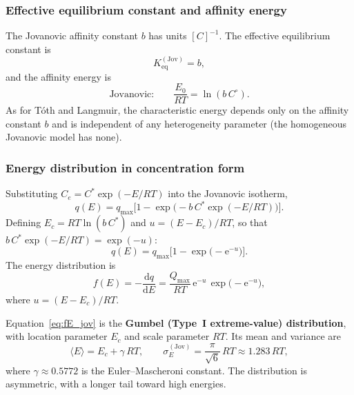 \documentclass[12pt]{article}
\begin{document}
	\subsubsection{Effective equilibrium constant and affinity energy}

	The Jovanovic affinity constant $b$ has units $[C]^{-1}$. The effective
	equilibrium constant is
	\begin{equation}
		K_{\mathrm{eq}}^{\mathrm{(Jov)}} = b,
	\end{equation}
	and the affinity energy is
	\begin{equation}
		\text{Jovanovic:}\qquad
		\frac{E_0}{RT} = \ln(b\,C^\circ).
		\label{eq:E_jov}
	\end{equation}
	As for T\'oth and Langmuir, the characteristic energy depends only on
	the affinity constant $b$ and is independent of any heterogeneity
	parameter (the homogeneous Jovanovic model has none).

	\subsubsection{Energy distribution in concentration form}

	Substituting $C_e = C^{\ast}\exp(-E/RT)$ into the Jovanovic isotherm,
	\begin{equation}
		q(E) = q_{\max}\bigl[1 -
		\exp\!\bigl(-b\,C^{\ast}\exp(-E/RT)\bigr)\bigr].
	\end{equation}
	Defining $E_c = RT\ln(b\,C^{\ast})$ and $u = (E - E_c)/RT$, so that
	$b\,C^{\ast}\exp(-E/RT) = \exp(-u)$:
	\begin{equation}
		q(E) = q_{\max}\bigl[1 -
		\exp\!\bigl(-\mathrm{e}^{-u}\bigr)\bigr].
		\label{eq:qE_jov}
	\end{equation}
	The energy distribution is
	\begin{equation}
		f(E) = -\frac{\mathrm{d}q}{\mathrm{d}E}
		= \frac{Q_{\max}}{RT}\,
		\mathrm{e}^{-u}\,
		\exp\!\bigl(-\mathrm{e}^{-u}\bigr),
		\label{eq:fE_jov}
	\end{equation}
	where $u = (E - E_c)/RT$.

	Equation~\eqref{eq:fE_jov} is the \textbf{Gumbel (Type~I
	extreme-value) distribution}, with location parameter $E_c$ and scale
	parameter $RT$. Its mean and variance are
	\begin{equation}
		\langle E \rangle = E_c + \gamma\,RT,
		\qquad
		\sigma_E^{\mathrm{(Jov)}}
		= \frac{\pi}{\sqrt{6}}\,RT
		\approx 1.283\,RT,
		\label{eq:sigmaE_jov}
	\end{equation}
	where $\gamma \approx 0.5772$ is the Euler--Mascheroni constant. The
	distribution is asymmetric, with a longer tail toward high energies.
\end{document}
